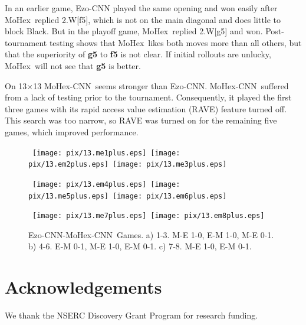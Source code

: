\documentclass{IOS-Book-Article}
\def\Ec{\mbox{\sc Ezo-CNN}}
\def\Mx{\mbox{\sc MoHex}}
\def\Mc{\mbox{\sc MoHex-CNN}}
\begin{document}
In an earlier game, \Ec{} played the same opening
and won easily after \Mx\ replied 2.W[f5], 
which is not on the main diagonal and does little to block Black.
But in the playoff game, \Mx\ replied 2.W[g5] and won.
Post-tournament testing shows that \Mx\ likes both moves more than all others,
but that the superiority of {\bf g5} to {\bf f5} is not clear.
If initial rollouts are unlucky, \Mx\ will not see that {\bf g5} is better.

On 13$\times$13 \Mc\ seems stronger than \Ec.
\Mc\ suffered from a lack of testing prior to the tournament.
Consequently, it played the first three games with 
its rapid access value estimation (RAVE)
feature turned off. This search was too narrow, 
so RAVE was turned on for the remaining five games, which improved
performance.

\begin{figure}
\noindent\hspace*{-2cm}\
\texttt{[image: pix/13.me1plus.eps]}\hspace*{-1.8cm}\
\texttt{[image: pix/13.em2plus.eps]}\hspace*{-1.8cm}\
\texttt{[image: pix/13.me3plus.eps]}
\smallskip

\noindent\hspace*{-2cm}\
\texttt{[image: pix/13.em4plus.eps]}\hspace*{-1.8cm}\
\texttt{[image: pix/13.me5plus.eps]}\hspace*{-1.8cm}\
\texttt{[image: pix/13.em6plus.eps]}\
\smallskip

\noindent\hspace*{-.4cm}\
\texttt{[image: pix/13.me7plus.eps]}\hspace*{-1.8cm}\
\texttt{[image: pix/13.em8plus.eps]}
\caption{\Ec{}-\Mc\ Games. 
a) 1-3. M-E 1-0, E-M 1-0, M-E 0-1.
b) 4-6. E-M 0-1, M-E 1-0, E-M 0-1.
c) 7-8. M-E 1-0, E-M 0-1.}
\label{fig:EM13}
\end{figure}

\section*{Acknowledgements}
We thank the NSERC Discovery Grant Program for research funding.


\end{document}
